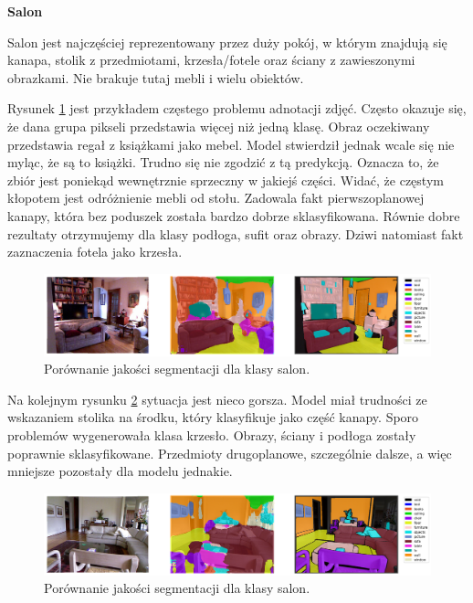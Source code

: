 \noindent
\textbf{Salon}

Salon jest najczęściej reprezentowany przez duży pokój, w którym znajdują się kanapa, stolik z przedmiotami, krzesła/fotele oraz ściany z zawieszonymi obrazkami. Nie brakuje tutaj mebli i wielu obiektów.

Rysunek \ref{fig:living_room-pred-1} jest przykładem częstego problemu adnotacji zdjęć. Często okazuje się, że dana grupa pikseli przedstawia więcej niż jedną klasę. Obraz oczekiwany przedstawia regał z książkami jako mebel. Model stwierdził jednak wcale się nie myląc, że są to książki. Trudno się nie zgodzić z tą predykcją. Oznacza to, że zbiór jest poniekąd wewnętrznie sprzeczny w jakiejś części. Widać, że częstym kłopotem jest odróżnienie mebli od stołu. Zadowala fakt pierwszoplanowej kanapy, która bez poduszek została bardzo dobrze sklasyfikowana. Równie dobre rezultaty otrzymujemy dla klasy podłoga, sufit oraz obrazy. Dziwi natomiast fakt zaznaczenia fotela jako krzesła.

\begin{figure}[ht!]
    \centering
    \includegraphics[width=\textwidth]{img/preds_analysis/gt_vs_pred/living_room-1.png}
    \caption{Porównanie jakości segmentacji dla klasy salon.}
    \label{fig:living_room-pred-1}
\end{figure}

Na kolejnym rysunku \ref{fig:living_room-pred-2} sytuacja jest nieco gorsza. Model miał trudności ze wskazaniem stolika na środku, który klasyfikuje jako część kanapy. Sporo problemów wygenerowała klasa krzesło. Obrazy, ściany i podłoga zostały poprawnie sklasyfikowane. Przedmioty drugoplanowe, szczególnie dalsze, a więc mniejsze pozostały dla modelu jednakie.
\begin{figure}[ht!]
    \centering
    \includegraphics[width=\textwidth]{img/preds_analysis/gt_vs_pred/living_room-2.png}
    \caption{Porównanie jakości segmentacji dla klasy salon.}
    \label{fig:living_room-pred-2}
\end{figure}

